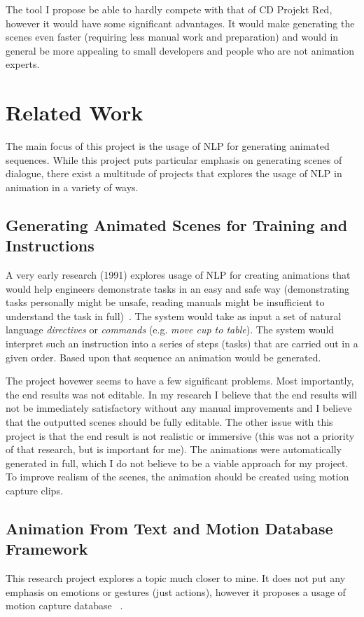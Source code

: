 The tool I propose be able to hardly compete with that of CD Projekt Red, however it would have some significant advantages. It would make generating the scenes even faster (requiring less manual work and preparation) and would in general be more appealing to small developers and people who are not animation experts.

\section{Related Work}
The main focus of this project is the usage of NLP for generating animated sequences. While this project puts particular emphasis on generating scenes of dialogue, there exist a multitude of projects that explores the usage of NLP in animation in a variety of ways.

\subsection{Generating Animated Scenes for Training and Instructions}
A very early research (1991) explores usage of NLP for creating animations that would help engineers demonstrate tasks in an easy and safe way (demonstrating tasks personally might be unsafe, reading manuals might be insufficient to understand the task in full)~\cite{animosha}. The system would take as input a set of natural language \textit{directives} or \textit{commands} (e.g. \textit{move cup to table}). The system would interpret such an instruction into a series of steps (tasks) that are carried out in a given order. Based upon that sequence an animation would be generated.

The project hovewer seems to have a few significant problems. Most importantly, the end results was not editable. In my research I believe that the end results will not be immediately satisfactory without any manual improvements and I believe that the outputted scenes should be fully editable. The other issue with this project is that the end result is not realistic or immersive (this was not a priority of that research, but is important for me). The animations were automatically generated in full, which I do not believe to be a viable approach for my project. To improve realism of the scenes, the animation should be created using motion capture clips.

\subsection{Animation From Text and Motion Database Framework}
This research project explores a topic much closer to mine. It does not put any emphasis on emotions or gestures (just actions), however it proposes a usage of motion capture database ~\cite{animmc}.



